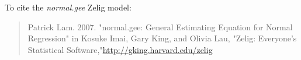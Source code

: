 To cite the \emph{ normal.gee } Zelig model:
 \begin{verse}
 Patrick Lam. 2007. "normal.gee: General Estimating Equation for Normal Regression" in Kosuke Imai, Gary King, and Olivia Lau, "Zelig: Everyone's Statistical Software,"\url{http://gking.harvard.edu/zelig} 
\end{verse}